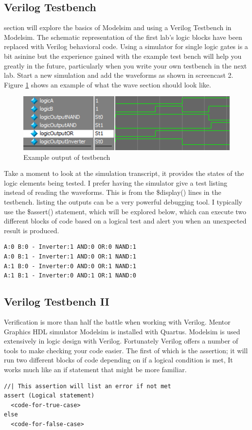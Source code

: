 \documentclass[12pt,journal]{IEEEtran}
\begin{document}
  \subsection{Verilog Testbench}
     section will explore the basics of Modelsim and using a Verilog Testbench in Modelsim. The schematic representation of the first lab's logic blocks have been replaced with Verilog behavioral code. Using a simulator for single logic gates is a bit asinine but the experience gained with the example test bench will help you greatly in the future, particularly when you write your own testbench in the next lab. Start a new simulation and add the waveforms as shown in screencast 2. Figure \ref{LogicOut} shows an example of what the wave section should look like. 
    \begin{figure}[H]
      \label{LogicOut}
      \includegraphics[width=.48\textwidth]{Images/LogicOutput.png}
      \caption{Example output of testbench}
    \end{figure}

    Take a moment to look at the simulation transcript, it provides the states of the logic elements being tested.
    I prefer having the simulator give a test listing instead of reading the waveforms. This is from the \$display()
    lines in the testbench. listing the outputs can be a very powerful debugging tool. I typically use the \$assert()
    statement, which will be explored below, which can execute two different blocks of code based on a logical test and alert you when an unexpected result is produced.
    \begin{lstlisting}
A:0 B:0 - Inverter:1 AND:0 OR:0 NAND:1
A:0 B:1 - Inverter:1 AND:0 OR:1 NAND:1
A:1 B:0 - Inverter:0 AND:0 OR:1 NAND:1
A:1 B:1 - Inverter:0 AND:1 OR:1 NAND:0
    \end{lstlisting}

  \subsection{Verilog Testbench II}
    Verification is more than half the battle when working with Verilog. Mentor Graphics HDL simulator Modelsim is installed with Quartus. Modelsim is used extensively in logic design with Verilog. Fortunately Verilog offers a number of tools to make checking your code easier. The first of which is the assertion; it will run two different blocks of code depending on if a logical condition is met, It works much like an if statement that might be more familiar.
    \begin{lstlisting}[caption={Template for System Verilog assertion}]
//| This assertion will list an error if not met
assert (Logical statement)
  <code-for-true-case>
else
  <code-for-false-case>
    \end{lstlisting}
\end{document}

